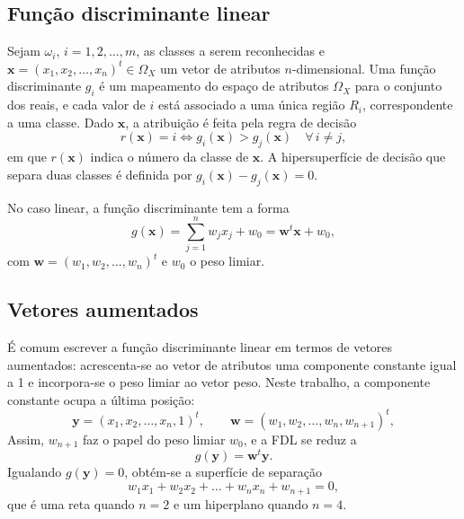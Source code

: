 \documentclass[12pt,a4paper]{article}
\begin{document}
\subsection{Função discriminante linear}

Sejam $\omega_i$, $i = 1, 2, \dots, m$, as classes a serem reconhecidas e $\mathbf{x} = (x_1, x_2, \dots, x_n)^t \in \Omega_X$ um vetor de atributos $n$-dimensional. Uma função discriminante $g_i$ é um mapeamento do espaço de atributos $\Omega_X$ para o conjunto dos reais, e cada valor de $i$ está associado a uma única região $R_i$, correspondente a uma classe. Dado $\mathbf{x}$, a atribuição é feita pela regra de decisão
\begin{equation}
  r(\mathbf{x}) = i \iff g_i(\mathbf{x}) > g_j(\mathbf{x}) \quad \forall\, i \neq j,
  \label{eq:regra}
\end{equation}
em que $r(\mathbf{x})$ indica o número da classe de $\mathbf{x}$. A hipersuperfície de decisão que separa duas classes é definida por $g_i(\mathbf{x}) - g_j(\mathbf{x}) = 0$.

No caso linear, a função discriminante tem a forma
\begin{equation}
  g(\mathbf{x}) = \sum_{j=1}^{n} w_j x_j + w_0 = \mathbf{w}^t\mathbf{x} + w_0,
  \label{eq:fdl}
\end{equation}
com $\mathbf{w} = (w_1, w_2, \dots, w_n)^t$ e $w_0$ o peso limiar.

\subsection{Vetores aumentados}

É comum escrever a função discriminante linear em termos de vetores aumentados: acrescenta-se ao vetor de atributos uma componente constante igual a 1 e incorpora-se o peso limiar ao vetor peso. Neste trabalho, a componente constante ocupa a última posição:
\begin{equation}
  \mathbf{y} = (x_1, x_2, \dots, x_n, 1)^t, \qquad
  \mathbf{w} = (w_1, w_2, \dots, w_n, w_{n+1})^t,
  \label{eq:aumentado}
\end{equation}
Assim, $w_{n+1}$ faz o papel do peso limiar $w_0$, e a FDL se reduz a
\begin{equation}
  g(\mathbf{y}) = \mathbf{w}^t\mathbf{y}.
  \label{eq:fdl_aumentada}
\end{equation}
Igualando $g(\mathbf{y}) = 0$, obtém-se a superfície de separação
\begin{equation}
  w_1x_1 + w_2x_2 + \dots + w_nx_n + w_{n+1} = 0,
  \label{eq:superficie}
\end{equation}
que é uma reta quando $n = 2$ e um hiperplano quando $n = 4$.
\end{document}
